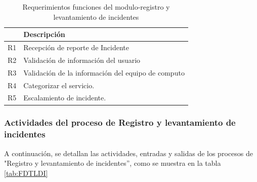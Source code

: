 \begin{table}[H]
	\centering
	\caption{Requerimientos funciones del modulo-registro y levantamiento de incidentes }
	\begin{tabular}{|l|l|}
		\toprule
		\rowcolor[rgb]{ .125,  .216,  .392} \multicolumn{1}{|p{12.5em}|}{\textcolor[rgb]{ 1,  1,  1}{\textbf{Requerimiento}}} & \multicolumn{1}{p{24.285em}|}{\textcolor[rgb]{ 1,  1,  1}{\textbf{Descripción}}} \\
		\midrule
		\multicolumn{1}{|p{12.5em}|}{R1} & \multicolumn{1}{p{24.285em}|}{Recepción de reporte de Incidente} \\
		\midrule
		\multicolumn{1}{|p{12.5em}|}{R2} & \multicolumn{1}{p{24.285em}|}{Validación de información del usuario} \\
		\midrule
		\multicolumn{1}{|p{12.5em}|}{R3} & \multicolumn{1}{p{24.285em}|}{Validación de la información del equipo de computo} \\
		\midrule
		\multicolumn{1}{|p{12.5em}|}{R4} & \multicolumn{1}{p{24.285em}|}{Categorizar el servicio.} \\
		\midrule
		R5 & Escalamiento de incidente. \\
		\bottomrule
	\end{tabular}%
	\label{tab:addlabel}%
\end{table}%
\subsubsection{Actividades del proceso de Registro y levantamiento de incidentes}
A continuación, se detallan las actividades, entradas y salidas de los procesos de "Registro y levantamiento de incidentes”, como se muestra en la tabla \ref{tab:FDTLDI} 



